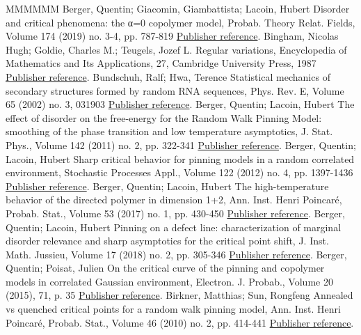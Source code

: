 \begin{thebibliography}{MMMMMM}
 Berger, Quentin; Giacomin, Giambattista; Lacoin, Hubert Disorder and critical phenomena: the α=0 copolymer model, Probab. Theory Relat. Fields, Volume 174 (2019) no. 3-4, pp. 787-819 \href{https://ahl.centre-mersenne.org/item/AHL_2020__3__299_0/#cf:BGL}{Publisher reference}.
 Bingham, Nicolas Hugh; Goldie, Charles M.; Teugels, Jozef L. Regular variations, Encyclopedia of Mathematics and Its Applications, 27, Cambridge University Press, 1987 \href{https://ahl.centre-mersenne.org/item/AHL_2020__3__299_0/#cf:BGT}{Publisher reference}.
 Bundschuh, Ralf; Hwa, Terence Statistical mechanics of secondary structures formed by random RNA sequences, Phys. Rev. E, Volume 65 (2002) no. 3, 031903 \href{https://ahl.centre-mersenne.org/item/AHL_2020__3__299_0/#cf:BundHwa}{Publisher reference}.
 Berger, Quentin; Lacoin, Hubert The effect of disorder on the free-energy for the Random Walk Pinning Model: smoothing of the phase transition and low temperature asymptotics, J. Stat. Phys., Volume 142 (2011) no. 2, pp. 322-341 \href{https://ahl.centre-mersenne.org/item/AHL_2020__3__299_0/#cf:BL11}{Publisher reference}.
 Berger, Quentin; Lacoin, Hubert Sharp critical behavior for pinning models in a random correlated environment, Stochastic Processes Appl., Volume 122 (2012) no. 4, pp. 1397-1436 \href{https://ahl.centre-mersenne.org/item/AHL_2020__3__299_0/#cf:BL12}{Publisher reference}.
 Berger, Quentin; Lacoin, Hubert The high-temperature behavior of the directed polymer in dimension 1+2, Ann. Inst. Henri Poincaré, Probab. Stat., Volume 53 (2017) no. 1, pp. 430-450 \href{https://ahl.centre-mersenne.org/item/AHL_2020__3__299_0/#cf:BL16bis}{Publisher reference}.
 Berger, Quentin; Lacoin, Hubert Pinning on a defect line: characterization of marginal disorder relevance and sharp asymptotics for the critical point shift, J. Inst. Math. Jussieu, Volume 17 (2018) no. 2, pp. 305-346 \href{https://ahl.centre-mersenne.org/item/AHL_2020__3__299_0/#cf:BL16}{Publisher reference}.
 Berger, Quentin; Poisat, Julien On the critical curve of the pinning and copolymer models in correlated Gaussian environment, Electron. J. Probab., Volume 20 (2015), 71, p. 35 \href{https://ahl.centre-mersenne.org/item/AHL_2020__3__299_0/#cf:BP15}{Publisher reference}.
 Birkner, Matthias; Sun, Rongfeng Annealed vs quenched critical points for a random walk pinning model, Ann. Inst. Henri Poincaré, Probab. Stat., Volume 46 (2010) no. 2, pp. 414-441 \href{https://ahl.centre-mersenne.org/item/AHL_2020__3__299_0/#cf:BS1}{Publisher reference}.

\end{thebibliography}
